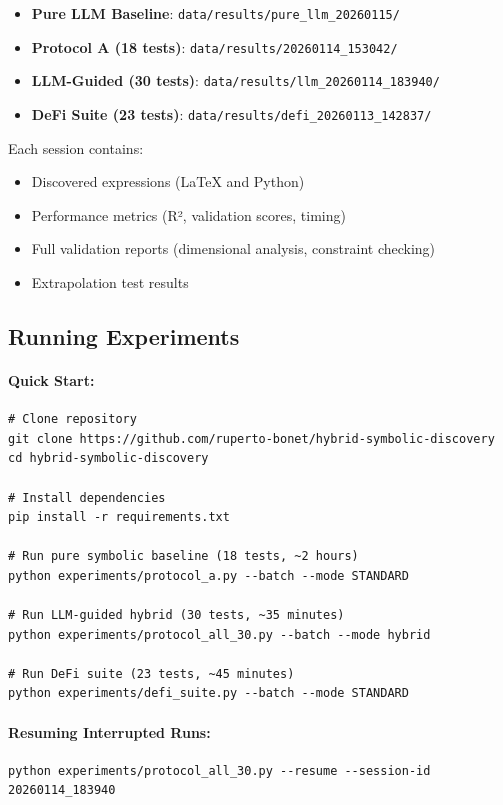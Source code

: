 \documentclass[twoside,11pt]{article}
\begin{document}
\begin{itemize}
\item \textbf{Pure LLM Baseline}: \texttt{data/results/pure\_llm\_20260115/}
\item \textbf{Protocol A (18 tests)}: \texttt{data/results/20260114\_153042/}
\item \textbf{LLM-Guided (30 tests)}: \texttt{data/results/llm\_20260114\_183940/}
\item \textbf{DeFi Suite (23 tests)}: \texttt{data/results/defi\_20260113\_142837/}
\end{itemize}

Each session contains:
\begin{itemize}
\item Discovered expressions (LaTeX and Python)
\item Performance metrics (R², validation scores, timing)
\item Full validation reports (dimensional analysis, constraint checking)
\item Extrapolation test results
\end{itemize}

\subsection{Running Experiments}

\paragraph{Quick Start:}
\begin{small}
\begin{verbatim}
# Clone repository
git clone https://github.com/ruperto-bonet/hybrid-symbolic-discovery
cd hybrid-symbolic-discovery

# Install dependencies
pip install -r requirements.txt

# Run pure symbolic baseline (18 tests, ~2 hours)
python experiments/protocol_a.py --batch --mode STANDARD

# Run LLM-guided hybrid (30 tests, ~35 minutes)
python experiments/protocol_all_30.py --batch --mode hybrid

# Run DeFi suite (23 tests, ~45 minutes)
python experiments/defi_suite.py --batch --mode STANDARD
\end{verbatim}
\end{small}

\paragraph{Resuming Interrupted Runs:}
\begin{small}
\begin{verbatim}
python experiments/protocol_all_30.py --resume --session-id 20260114_183940
\end{verbatim}
\end{small}
\end{document}
